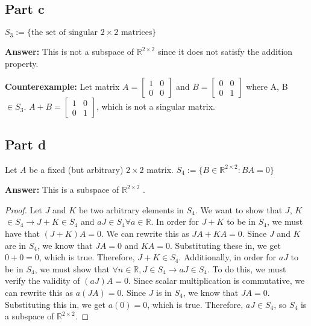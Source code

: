 \documentclass{article}
\begin{document}
\subsection*{Part c}
$S_{3} := \{\text{the set of singular } 2 \times 2 \text{ matrices}\}$

\textbf{Answer:} This is not a subspace of $\mathbb{R}^{2 \times 2}$ since it does not satisfy the addition property. %

\textbf{Counterexample:} Let matrix $A = \begin{bmatrix} 1 & 0 \\ 0 & 0 \end{bmatrix}$ and $B = \begin{bmatrix} 0 & 0 \\ 0 & 1 \end{bmatrix}$ where A, B $\in S_{3}$.
$A + B = \begin{bmatrix} 1 & 0 \\ 0 & 1 \end{bmatrix}$, which is not a singular matrix.

\subsection*{Part d}
Let \( A \) be a fixed (but arbitrary) \( 2 \times 2 \) matrix.
\newline
$S_{4} := \{B \in \mathbb{R}^{2 \times 2} : BA = 0\}$

\textbf{Answer:} This is a subspace of $\mathbb{R}^{2 \times 2}$ .

\begin{proof}
Let $J$ and $K$ be two arbitrary elements in $S_{4}$.
We want to show that $J$, $K$ $\in S_{4} \rightarrow J + K \in S_{4}$ and $aJ \in S_{4} \forall a \in \mathbb{R}$.
In order for $J + K$ to be in $S_{4}$, we must have that $(J+K)A = 0$.
We can rewrite this as $JA + KA = 0$.
Since $J$ and $K$ are in $S_{4}$, we know that $JA = 0$ and $KA = 0$.
Substituting these in, we get $0 + 0 = 0$, which is true.
Therefore, $J + K \in S_{4}$.
Additionally, in order for $aJ$ to be in $S_{4}$, we must show that $\forall n \in \mathbb{R}, J \in S_{4} \rightarrow aJ \in S_{4}$.
To do this, we must verify the validity of $(aJ)A = 0$.
Since scalar multiplication is commutative, we can rewrite this as $a(JA) = 0$.
Since $J$ is in $S_{4}$, we know that $JA = 0$.
Substituting this in, we get $a(0) = 0$, which is true.
Therefore, $aJ \in S_{4}$, so $S_{4}$ is a subspace of $\mathbb{R}^{2 \times 2}$.
\end{proof}
\end{document}
